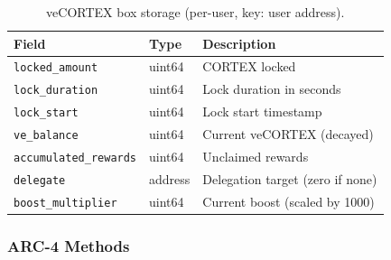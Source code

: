 \begin{table}[H]
\centering
\caption{veCORTEX box storage (per-user, key: user address).}
\label{tab:ve-box}
\begin{tabular}{@{}llp{6cm}@{}}
\toprule
\textbf{Field} & \textbf{Type} & \textbf{Description} \\
\midrule
\texttt{locked\_amount} & uint64 & CORTEX locked \\
\texttt{lock\_duration} & uint64 & Lock duration in seconds \\
\texttt{lock\_start} & uint64 & Lock start timestamp \\
\texttt{ve\_balance} & uint64 & Current veCORTEX (decayed) \\
\texttt{accumulated\_rewards} & uint64 & Unclaimed rewards \\
\texttt{delegate} & address & Delegation target (zero if none) \\
\texttt{boost\_multiplier} & uint64 & Current boost (scaled by 1000) \\
\bottomrule
\end{tabular}
\end{table}

\subsubsection{ARC-4 Methods}


